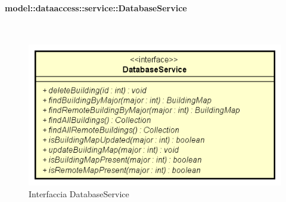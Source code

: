 \documentclass[../DefinizioneDiProdotto.tex]{subfiles}
\begin{document}
\paragraph{model::dataaccess::service::DatabaseService}
\
\begin{figure}[H]
	\centering
	\includegraphics[width=\maxwidth]{img/DatabaseService.png}
	\caption{Interfaccia DatabaseService}\label{fig:model::dataaccess::service::DatabaseService} 
\end{figure}
\end{document}
